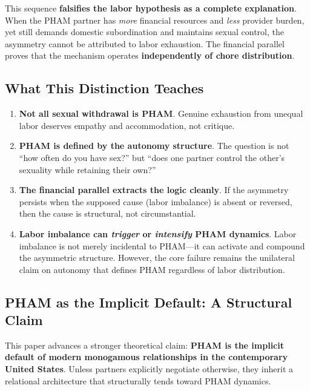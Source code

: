 \documentclass[12pt,openany]{book}
\numberwithin{equation}{chapter}
\begin{document}
This sequence \textbf{falsifies the labor hypothesis as a complete explanation}. When the PHAM partner has \textit{more} financial resources and \textit{less} provider burden, yet still demands domestic subordination and maintains sexual control, the asymmetry cannot be attributed to labor exhaustion. The financial parallel proves that the mechanism operates \textbf{independently of chore distribution}.

\subsection{What This Distinction Teaches}

\begin{enumerate}
    \item \textbf{Not all sexual withdrawal is PHAM}. Genuine exhaustion from unequal labor deserves empathy and accommodation, not critique.
    
    \item \textbf{PHAM is defined by the autonomy structure}. The question is not ``how often do you have sex?'' but ``does one partner control the other's sexuality while retaining their own?''
    
    \item \textbf{The financial parallel extracts the logic cleanly}. If the asymmetry persists when the supposed cause (labor imbalance) is absent or reversed, then the cause is structural, not circumstantial.
    
    \item \textbf{Labor imbalance can \textit{trigger} or \textit{intensify} PHAM dynamics}. Labor imbalance is not merely incidental to PHAM---it can activate and compound the asymmetric structure. However, the core failure remains the unilateral claim on autonomy that defines PHAM regardless of labor distribution.
\end{enumerate}

\subsection{PHAM as the Implicit Default: A Structural Claim}

This paper advances a stronger theoretical claim: \textbf{PHAM is the implicit default of modern monogamous relationships in the contemporary United States}. Unless partners explicitly negotiate otherwise, they inherit a relational architecture that structurally tends toward PHAM dynamics.
\end{document}
